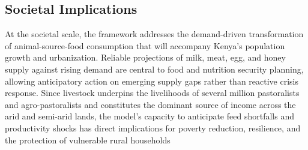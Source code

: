 \subsection{Societal Implications}
At the societal scale, the framework addresses the demand-driven transformation of animal-source-food consumption that will accompany Kenya’s population growth and urbanization. Reliable projections of milk, meat, egg, and honey supply against rising demand are central to food and nutrition security planning, allowing anticipatory action on emerging supply gaps rather than reactive crisis response. Since livestock underpins the livelihoods of several million pastoralists and agro-pastoralists and constitutes the dominant source of income across the arid and semi-arid lands, the model's capacity to anticipate feed shortfalls and productivity shocks has direct implications for poverty reduction, resilience, and the protection of vulnerable rural households %
